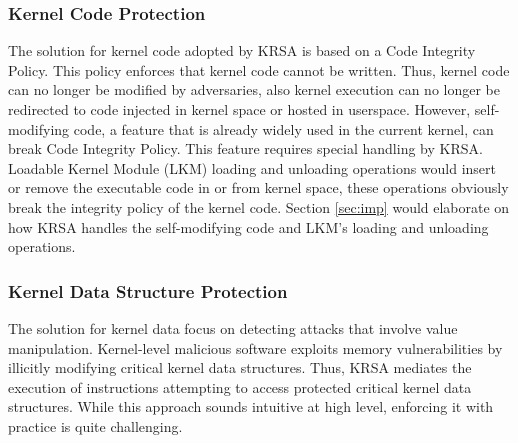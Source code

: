 \documentclass[conference]{IEEEtran}
\begin{document}
\subsubsection{Kernel Code Protection} \label{sec:codedesign}
The solution for kernel code adopted by KRSA is based on a Code Integrity Policy. This policy enforces that kernel code cannot be written. Thus, kernel code can no longer be modified by adversaries, also kernel execution can no longer be redirected to code injected in kernel space or hosted in userspace. However, self-modifying code, a feature that is already widely used in the current kernel, can break Code Integrity Policy. This feature requires special handling by KRSA. Loadable Kernel Module (LKM) loading and unloading operations would insert or remove the executable code in or from kernel space, these operations obviously break the integrity policy of the kernel code. 
Section \ref{sec:imp} would elaborate on how KRSA handles the self-modifying code and LKM's loading and unloading operations.

\subsubsection{Kernel Data Structure Protection} \label{sec:datadesign}
The solution for kernel data focus on detecting attacks that involve value manipulation. Kernel-level malicious software exploits memory vulnerabilities by illicitly modifying critical kernel data structures. Thus, KRSA mediates the execution of instructions attempting to access protected critical kernel data structures. While this approach sounds intuitive at high level, enforcing it with practice is quite challenging. 
\end{document}
